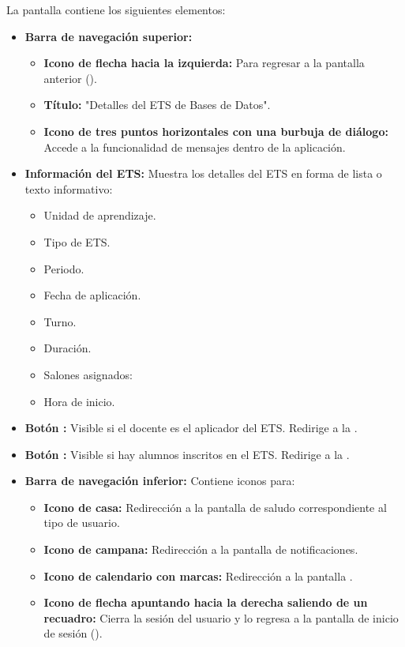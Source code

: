 La pantalla contiene los siguientes elementos:
\begin{itemize}
	\item \textbf{Barra de navegación superior:}
	\begin{itemize}
		\item \textbf{Icono de flecha hacia la izquierda:} Para regresar a la pantalla anterior ().
		\item \textbf{Título:} "Detalles del ETS de Bases de Datos".
		\item \textbf{Icono de tres puntos horizontales con una burbuja de diálogo:} Accede a la funcionalidad de mensajes dentro de la aplicación.
	\end{itemize}
	\item \textbf{Información del ETS:} Muestra los detalles del ETS en forma de lista o texto informativo:
	\begin{itemize}
		\item Unidad de aprendizaje.
		\item Tipo de ETS.
		\item Periodo.
		\item Fecha de aplicación.
		\item Turno.
		\item Duración.
		\item Salones asignados:
		\item Hora de inicio.
	\end{itemize}
	\item \textbf{Botón :} Visible si el docente es el aplicador del ETS. Redirige a la .
	\item \textbf{Botón :} Visible si hay alumnos inscritos en el ETS. Redirige a la .
	\item \textbf{Barra de navegación inferior:} Contiene iconos para:
	\begin{itemize}
		\item \textbf{Icono de casa:} Redirección a la pantalla de saludo correspondiente al tipo de usuario.
		\item \textbf{Icono de campana:} Redirección a la pantalla de notificaciones.
		\item \textbf{Icono de calendario con marcas:} Redirección a la pantalla .
		\item \textbf{Icono de flecha apuntando hacia la derecha saliendo de un recuadro:} Cierra la sesión del usuario y lo regresa a la pantalla de inicio de sesión ().
	\end{itemize}
\end{itemize}

